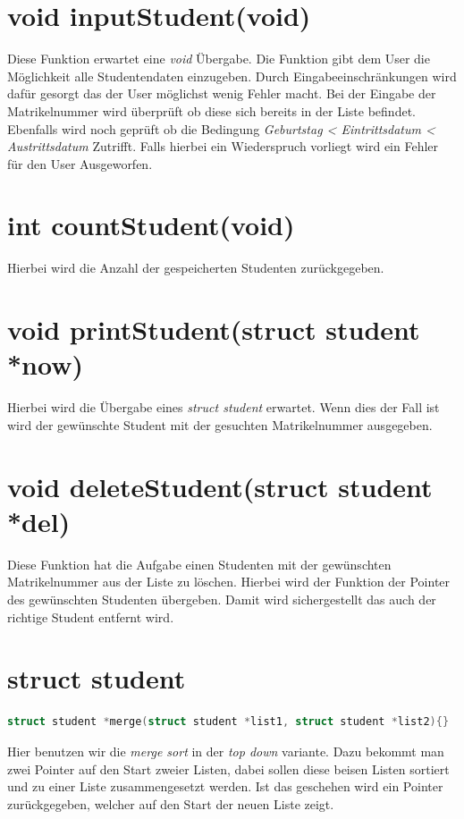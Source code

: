 \documentclass[a4paper, 11pt, oneside]{book} %
\begin{document}
\section{void inputStudent(void)}
Diese Funktion erwartet eine \textit{void} Übergabe. Die Funktion gibt dem User die Möglichkeit alle Studentendaten einzugeben. Durch Eingabeeinschränkungen wird dafür gesorgt das der User möglichst wenig Fehler macht. \newline Bei der Eingabe der Matrikelnummer wird überprüft ob diese sich bereits in der Liste befindet. \newline Ebenfalls wird noch geprüft ob die Bedingung \newline \textit{Geburtstag < Eintrittsdatum < Austrittsdatum} Zutrifft. Falls hierbei ein Wiederspruch vorliegt wird ein Fehler für den User Ausgeworfen.
\section{int countStudent(void)}
Hierbei wird die Anzahl der gespeicherten Studenten zurückgegeben.


\section{void printStudent(struct student *now)}
Hierbei wird die Übergabe eines \textit{struct student} erwartet. Wenn dies der Fall ist wird der gewünschte Student mit der gesuchten Matrikelnummer ausgegeben.

\section{void deleteStudent(struct student *del)}
Diese Funktion hat die Aufgabe einen Studenten mit der gewünschten Matrikelnummer aus der Liste zu löschen. Hierbei wird der Funktion der Pointer des gewünschten Studenten übergeben. Damit wird sichergestellt das auch der richtige Student entfernt wird.

\section{struct student}
\begin{lstlisting}[language=C]
	struct student *merge(struct student *list1, struct student *list2){}
\end{lstlisting}
Hier benutzen wir die \textit{merge sort} in der \textit{top down} variante. Dazu bekommt man zwei Pointer auf den Start zweier Listen, dabei sollen diese beisen Listen sortiert und zu einer Liste zusammengesetzt werden. Ist das geschehen wird ein Pointer zurückgegeben, welcher auf den Start der neuen Liste zeigt.
\end{document}
